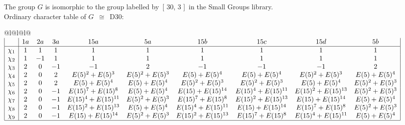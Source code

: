 \documentclass[varwidth=\maxdimen,border=10]{standalone}
\begin{document}
The group $G$ is isomorphic to the group labelled by\ [ 30, 3 ]\ in the Small Groups library.\\
Ordinary character table of $G$\ $\cong$\ D30:\\
\begin{center}
\begin{tabular}{@{}l@{}l@{}l@{}}
\hline
\(\begin{array}{|l|ccccccccc|}
  & 1a & 2a & 3a & 15a & 5a & 15b & 15c & 15d & 5b\\ \hline
\chi_{1} & 1 & 1 & 1 & 1 & 1 & 1 & 1 & 1 & 1\\
\chi_{2} & 1 & -1 & 1 & 1 & 1 & 1 & 1 & 1 & 1\\
\chi_{3} & 2 & 0 & -1 & -1 & 2 & -1 & -1 & -1 & 2\\
\chi_{4} & 2 & 0 & 2 & E(5)^{2}+E(5)^{3} & E(5)^{2}+E(5)^{3} & E(5)+E(5)^{4} & E(5)+E(5)^{4} & E(5)^{2}+E(5)^{3} & E(5)+E(5)^{4}\\
\chi_{5} & 2 & 0 & 2 & E(5)+E(5)^{4} & E(5)+E(5)^{4} & E(5)^{2}+E(5)^{3} & E(5)^{2}+E(5)^{3} & E(5)+E(5)^{4} & E(5)^{2}+E(5)^{3}\\
\chi_{6} & 2 & 0 & -1 & E(15)^{7}+E(15)^{8} & E(5)+E(5)^{4} & E(15)+E(15)^{14} & E(15)^{4}+E(15)^{11} & E(15)^{2}+E(15)^{13} & E(5)^{2}+E(5)^{3}\\
\chi_{7} & 2 & 0 & -1 & E(15)^{4}+E(15)^{11} & E(5)^{2}+E(5)^{3} & E(15)^{7}+E(15)^{8} & E(15)^{2}+E(15)^{13} & E(15)+E(15)^{14} & E(5)+E(5)^{4}\\
\chi_{8} & 2 & 0 & -1 & E(15)^{2}+E(15)^{13} & E(5)+E(5)^{4} & E(15)^{4}+E(15)^{11} & E(15)+E(15)^{14} & E(15)^{7}+E(15)^{8} & E(5)^{2}+E(5)^{3}\\
\chi_{9} & 2 & 0 & -1 & E(15)+E(15)^{14} & E(5)^{2}+E(5)^{3} & E(15)^{2}+E(15)^{13} & E(15)^{7}+E(15)^{8} & E(15)^{4}+E(15)^{11} & E(5)+E(5)^{4}\\
\hline
\end{array}\)\\
\end{tabular}
\end{center}
\end{document}
